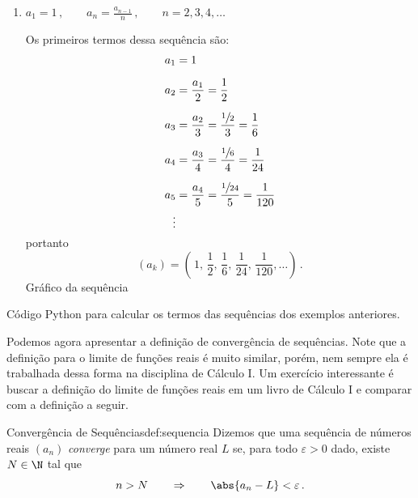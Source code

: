 \begin{example}
\begin{enumerate}
    \item \( a_1 = 1 \,,
      \qquad a_{n} = \frac{a_{n-1}}{n} \,,
      \qquad n = 2, 3, 4, \dots \) \par
    Os primeiros termos dessa sequência são:
    \begin{align*}
      a_1 & = 1                                                       \\[2mm]
      a_2 & = \frac{a_1}{2} = \frac{1}{2}                             \\[2mm]
      a_3 & = \frac{a_2}{3} = \frac{\sfrac{1}{2}}{3}  = \frac{1}{6}   \\[2mm]
      a_4 & = \frac{a_3}{4} = \frac{\sfrac{1}{6}}{4}  = \frac{1}{24}  \\[2mm]
      a_5 & = \frac{a_4}{5} = \frac{\sfrac{1}{24}}{5} = \frac{1}{120} \\
      \vdots
    \end{align*}
    portanto
    \[
      (a_k) = \left(\, 1, \,
                       \frac{1}{2},  \,
                       \frac{1}{6},  \,
                       \frac{1}{24}, \,
                       \frac{1}{120}, \dots \right) \,.
    \]
    Gráfico da sequência
    \begin{flushleft}
      
    \end{flushleft}
  \end{enumerate}
\end{example}

{
  Código Python para calcular os termos das sequências dos exemplos anteriores.
}

Podemos agora apresentar a definição de convergência de sequências.
Note que a definição para o limite de funções reais é muito similar, porém,
nem sempre ela é trabalhada dessa forma na disciplina de Cálculo I.
Um exercício interessante é buscar a definição
do limite de funções reais em um livro de Cálculo I e comparar com a definição
a seguir.

\begin{definicao}{Convergência de Sequências}{def:sequencia}
  Dizemos que uma sequência de números reais $(a_n)$
  \emph{converge}
  para um número real $L$ se, para todo $\varepsilon>0$ dado, existe $N\in \N$ tal que
  \[
    n > N \qquad \Rightarrow  \qquad \abs{a_n-L} < \varepsilon \,.
  \]
\end{definicao}

